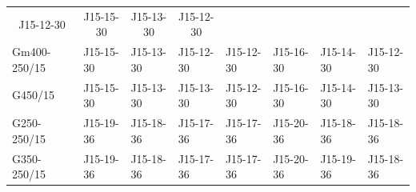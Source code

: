 \begin{longtable}[c]{|p{1.5cm}|p{1cm}|p{1cm}|p{1cm}|p{1cm}|p{1cm}|p{1cm}|p{1cm}|}
	\multicolumn{1}{c|}{\multirow{2}{*}{J15-12-30}} &
	\multicolumn{1}{c|}{\multirow{2}{*}{J15-15-30}} &
	\multicolumn{1}{c|}{\multirow{2}{*}{J15-13-30}} &
	\multicolumn{1}{c|}{\multirow{2}{*}{J15-12-30}} \\ \cline{1-1}
	\multicolumn{1}{|l|}{Gm350-250/15} &
	\multicolumn{1}{c|}{} &
	\multicolumn{1}{c|}{} &
	\multicolumn{1}{c|}{} &
	\multicolumn{1}{c|}{} &
	\multicolumn{1}{c|}{} &
	\multicolumn{1}{c|}{} &
	\multicolumn{1}{c|}{} \\ \hline
	\multicolumn{1}{|l|}{Gm400-250/15} &
	\multicolumn{1}{l|}{J15-15-30} &
	\multicolumn{1}{l|}{J15-13-30} &
	\multicolumn{1}{l|}{J15-12-30} &
	\multicolumn{1}{l|}{J15-12-30} &
	\multicolumn{1}{l|}{J15-16-30} &
	\multicolumn{1}{l|}{J15-14-30} &
	J15-12-30 \\ \hline
	\multicolumn{1}{|l|}{G450/15} &
	\multicolumn{1}{l|}{J15-15-30} &
	\multicolumn{1}{l|}{J15-13-30} &
	\multicolumn{1}{l|}{J15-13-30} &
	\multicolumn{1}{l|}{J15-12-30} &
	\multicolumn{1}{l|}{J15-16-30} &
	\multicolumn{1}{l|}{J15-14-30} &
	J15-13-30 \\ \hline
	\multicolumn{1}{|l|}{G250-250/15} &
	\multicolumn{1}{l|}{J15-19-36} &
	\multicolumn{1}{l|}{J15-18-36} &
	\multicolumn{1}{l|}{J15-17-36} &
	\multicolumn{1}{l|}{J15-17-36} &
	\multicolumn{1}{l|}{J15-20-36} &
	\multicolumn{1}{l|}{J15-18-36} &
	J15-18-36 \\ \hline
	\multicolumn{1}{|l|}{G350-250/15} &
	\multicolumn{1}{l|}{J15-19-36} &
	\multicolumn{1}{l|}{J15-18-36} &
	\multicolumn{1}{l|}{J15-17-36} &
	\multicolumn{1}{l|}{J15-17-36} &
	\multicolumn{1}{l|}{J15-20-36} &
	\multicolumn{1}{l|}{J15-19-36} &
	J15-18-36 \\ \hline
\end{longtable}

